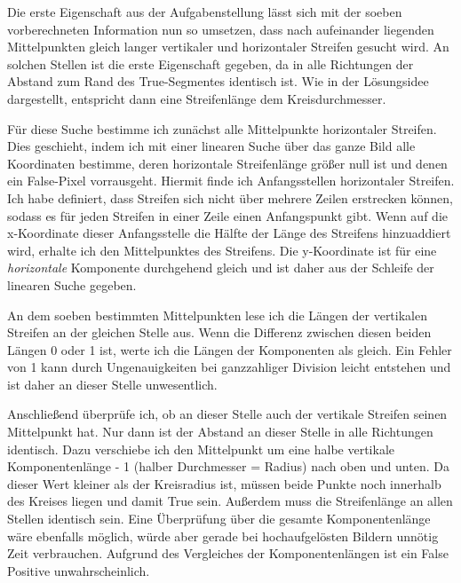 Die erste Eigenschaft aus der Aufgabenstellung lässt sich mit der soeben vorberechneten Information nun so umsetzen, dass nach aufeinander liegenden Mittelpunkten gleich langer vertikaler und horizontaler Streifen gesucht wird.
An solchen Stellen ist die erste Eigenschaft gegeben, da in alle Richtungen der Abstand zum Rand des True-Segmentes identisch ist. Wie in der Lösungsidee dargestellt, entspricht dann eine Streifenlänge dem Kreisdurchmesser.

Für diese Suche bestimme ich zunächst alle Mittelpunkte horizontaler Streifen. Dies geschieht, indem ich mit einer linearen Suche über das ganze Bild alle Koordinaten bestimme, deren horizontale Streifenlänge größer null ist und denen ein False-Pixel vorrausgeht.
Hiermit finde ich Anfangsstellen horizontaler Streifen. Ich habe definiert, dass Streifen sich nicht über mehrere Zeilen erstrecken können, sodass es für jeden Streifen in einer Zeile einen Anfangspunkt gibt.
Wenn auf die x-Koordinate dieser Anfangsstelle die Hälfte der Länge des Streifens hinzuaddiert wird, erhalte ich den Mittelpunktes des Streifens.
Die y-Koordinate ist für eine \textit{horizontale} Komponente durchgehend gleich und ist daher aus der Schleife der linearen Suche gegeben.

An dem soeben bestimmten Mittelpunkten lese ich die Längen der vertikalen Streifen an der gleichen Stelle aus. Wenn die Differenz zwischen diesen beiden Längen 0 oder 1 ist, werte ich die Längen der Komponenten als gleich.
Ein Fehler von 1 kann durch Ungenauigkeiten bei ganzzahliger Division leicht entstehen und ist daher an dieser Stelle unwesentlich.

Anschließend überprüfe ich, ob an dieser Stelle auch der vertikale Streifen seinen Mittelpunkt hat. Nur dann ist der Abstand an dieser Stelle in alle Richtungen identisch. Dazu verschiebe ich den Mittelpunkt um eine halbe vertikale Komponentenlänge - 1 (halber Durchmesser = Radius) nach oben und unten. Da dieser Wert kleiner als der Kreisradius ist, müssen beide Punkte noch innerhalb des Kreises liegen und damit True sein. Außerdem muss die Streifenlänge an allen Stellen identisch sein.
Eine Überprüfung über die gesamte Komponentenlänge wäre ebenfalls möglich, würde aber gerade bei hochaufgelösten Bildern unnötig Zeit verbrauchen. Aufgrund des Vergleiches der Komponentenlängen ist ein False Positive unwahrscheinlich.

